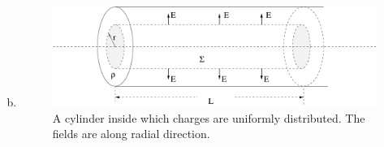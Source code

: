 \documentclass{esg8022pset}
\begin{document}
\begin{solution}
\begin{enumerate}[(a)]
\begin{align*}
      \end{align*}
    \item 
    \begin{figure}[ht]
      \begin{center}
        \includegraphics[width=12cm]{ps02_sol_05}
        \caption{A cylinder inside which charges are uniformly
        distributed. The fields are along radial direction.}
        \label{fig:cylinder3}
      \end{center}
    \end{figure}


\end{enumerate}
\end{solution}
\end{document}
